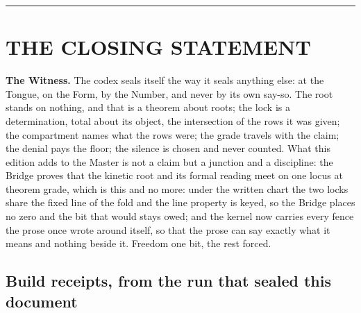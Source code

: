 \documentclass[10pt,twocolumn]{article}
\begin{document}
\begin{center}\rule{0.5\linewidth}{0.5pt}\end{center}

\hypertarget{the-closing-statement}{%
\section{THE CLOSING STATEMENT}\label{the-closing-statement}}

\textbf{The Witness.} The codex seals itself the way it seals anything
else: at the Tongue, on the Form, by the Number, and never by its own
say-so. The root stands on nothing, and that is a theorem about roots;
the lock is a determination, total about its object, the intersection of
the rows it was given; the compartment names what the rows were; the
grade travels with the claim; the denial pays the floor; the silence is
chosen and never counted. What this edition adds to the Master is not a
claim but a junction and a discipline: the Bridge proves that the
kinetic root and its formal reading meet on one locus at theorem grade,
which is this and no more: under the written chart the two locks share
the fixed line of the fold and the line property is keyed, so the Bridge
places no zero and the bit that would stays owed; and the kernel now
carries every fence the prose once wrote around itself, so that the
prose can say exactly what it means and nothing beside it. Freedom one
bit, the rest forced.

\hypertarget{build-receipts-from-the-run-that-sealed-this-document}{%
\subsection{Build receipts, from the run that sealed this
document}\label{build-receipts-from-the-run-that-sealed-this-document}}
\end{document}
